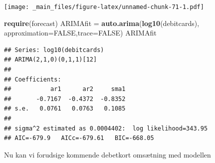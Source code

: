 \documentclass[]{book}
\newenvironment{Shaded}{\begin{snugshade}}{\end{snugshade}}
\newcommand{\DataTypeTok}[1]{\textcolor[rgb]{0.13,0.29,0.53}{#1}}
\newcommand{\DecValTok}[1]{\textcolor[rgb]{0.00,0.00,0.81}{#1}}
\newcommand{\KeywordTok}[1]{\textcolor[rgb]{0.13,0.29,0.53}{\textbf{#1}}}
\newcommand{\NormalTok}[1]{#1}
\newcommand{\OperatorTok}[1]{\textcolor[rgb]{0.81,0.36,0.00}{\textbf{#1}}}
\newcommand{\OtherTok}[1]{\textcolor[rgb]{0.56,0.35,0.01}{#1}}
\newcommand{\StringTok}[1]{\textcolor[rgb]{0.31,0.60,0.02}{#1}}
\begin{document}
\texttt{[image: \_main\_files/figure-latex/unnamed-chunk-71-1.pdf]}

\begin{Shaded}
\begin{Highlighting}[]
\KeywordTok{require}\NormalTok{(forecast)}
\NormalTok{ARIMAfit =}\StringTok{ }\KeywordTok{auto.arima}\NormalTok{(}\KeywordTok{log10}\NormalTok{(debitcards), }\DataTypeTok{approximation=}\OtherTok{FALSE}\NormalTok{,}\DataTypeTok{trace=}\OtherTok{FALSE}\NormalTok{)}
\NormalTok{ARIMAfit}
\end{Highlighting}
\end{Shaded}

\begin{verbatim}
## Series: log10(debitcards) 
## ARIMA(2,1,0)(0,1,1)[12] 
## 
## Coefficients:
##           ar1      ar2     sma1
##       -0.7167  -0.4372  -0.8352
## s.e.   0.0761   0.0763   0.1085
## 
## sigma^2 estimated as 0.0004402:  log likelihood=343.95
## AIC=-679.9   AICc=-679.61   BIC=-668.05
\end{verbatim}

Nu kan vi forudsige kommende debetkort omsætning med modellen

\begin{Shaded}
\end{Shaded}
\end{document}
